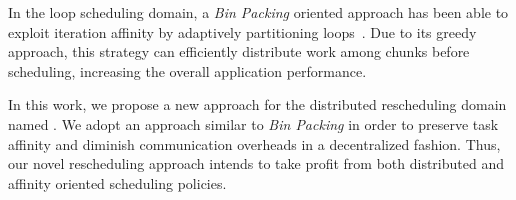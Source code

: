 In the loop scheduling domain, a \textit{Bin Packing} oriented approach has been able to exploit iteration affinity by adaptively partitioning loops~\cite{Castro-Penna-WSCAD:2017}.
Due to its greedy approach, this strategy can efficiently distribute work among chunks before scheduling, increasing the overall application performance.

In this work, we propose a new approach for the distributed rescheduling domain named \packdrop.
We adopt an approach similar to \textit{Bin Packing} in order to preserve task affinity and diminish communication overheads in a decentralized fashion.
Thus, our novel rescheduling approach intends to take profit from both distributed and affinity oriented scheduling policies.
